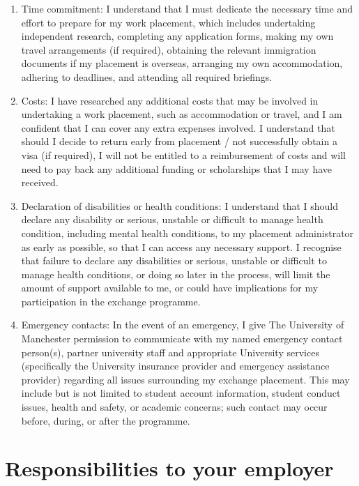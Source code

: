 \documentclass[
]{book}
\providecommand{\tightlist}{%
  \setlength{\itemsep}{0pt}\setlength{\parskip}{0pt}}
\begin{document}
\begin{enumerate}
\def\labelenumi{\arabic{enumi}.}
\tightlist
\item
  Time commitment: I understand that I must dedicate the necessary time and effort to prepare for my work placement, which includes undertaking independent research, completing any application forms, making my own travel arrangements (if required), obtaining the relevant immigration documents if my
  placement is overseas, arranging my own accommodation, adhering to deadlines, and attending all required briefings.
\item
  Costs: I have researched any additional costs that may be involved in undertaking a work placement, such as accommodation or travel, and I am confident that I can cover any extra expenses involved. I understand that should I decide to return early from placement / not successfully obtain a visa (if required), I will not be entitled to a reimbursement of costs and will need to pay back any additional funding or scholarships that I may have received.
\item
  Declaration of disabilities or health conditions: I understand that I should declare any disability or serious, unstable or difficult to manage health condition, including mental health conditions, to my placement administrator as early as possible, so that I can access any necessary support. I recognise that failure to declare any disabilities or serious, unstable or difficult to manage health conditions, or doing so later in the process, will limit the amount of support available to me, or could have implications for my participation in the exchange programme.
\item
  Emergency contacts: In the event of an emergency, I give The University of Manchester permission to communicate with my named emergency contact person(s), partner university staff and appropriate University services (specifically the University insurance provider and emergency assistance provider) regarding all issues surrounding my exchange placement. This may include but is not limited to student account information, student conduct issues, health and safety, or academic concerns; such contact
  may occur before, during, or after the programme.
\end{enumerate}

\section{Responsibilities to your employer}\label{remployer}
\end{document}
